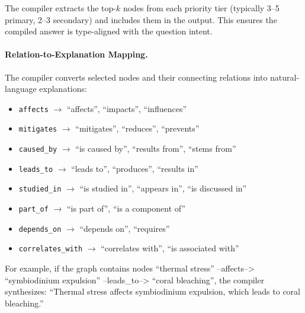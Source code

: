 \documentclass[11pt]{article}
\begin{document}
The compiler extracts the top-$k$ nodes from each priority tier (typically 3--5 primary, 2--3 secondary) and includes them in the output. This ensures the compiled answer is type-aligned with the question intent.

\paragraph{Relation-to-Explanation Mapping.} The compiler converts selected nodes and their connecting relations into natural-language explanations:

\begin{itemize}[leftmargin=1.2em]
  \item \texttt{affects} $\rightarrow$ ``affects'', ``impacts'', ``influences''
  \item \texttt{mitigates} $\rightarrow$ ``mitigates'', ``reduces'', ``prevents''
  \item \texttt{caused\_by} $\rightarrow$ ``is caused by'', ``results from'', ``stems from''
  \item \texttt{leads\_to} $\rightarrow$ ``leads to'', ``produces'', ``results in''
  \item \texttt{studied\_in} $\rightarrow$ ``is studied in'', ``appears in'', ``is discussed in''
  \item \texttt{part\_of} $\rightarrow$ ``is part of'', ``is a component of''
  \item \texttt{depends\_on} $\rightarrow$ ``depends on'', ``requires''
  \item \texttt{correlates\_with} $\rightarrow$ ``correlates with'', ``is associated with''
\end{itemize}

For example, if the graph contains nodes ``thermal stress'' --affects--> ``symbiodinium expulsion'' --leads\_to--> ``coral bleaching'', the compiler synthesizes: ``Thermal stress affects symbiodinium expulsion, which leads to coral bleaching.''
\end{document}
